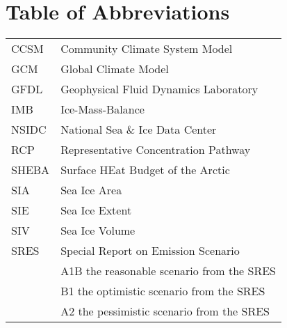 \section*{Table of Abbreviations}


\begin{table}[H]
\centering
\begin{tabular}{l l}

CCSM & Community Climate System Model\\
GCM & Global Climate Model\\
GFDL & Geophysical Fluid Dynamics Laboratory\\
IMB & Ice-Mass-Balance \\
NSIDC & National Sea \& Ice Data Center\\
RCP & Representative Concentration Pathway\\
SHEBA & Surface HEat Budget of the Arctic\\
SIA & Sea Ice Area\\
SIE & Sea Ice Extent\\
SIV & Sea Ice Volume\\
SRES & Special Report on Emission Scenario\\
& A1B  the reasonable scenario from the SRES \\
& B1 the  optimistic scenario from the SRES \\
& A2 the pessimistic scenario from the SRES \\




\end{tabular}
\end{table}


